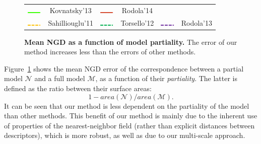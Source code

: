 \begin{figure}[h!]
\begin{tabular}{|cccccc|}
	\includegraphics[width=0.7cm]{figures/greenline.png} & \small{Kovnatsky'13\cite{kovnatsky2013coupled}} &
	\includegraphics[width=0.7cm]{figures/Dark_red_line.png} & \small{Rodola'14\cite{Rodola:2014:DNS:2679600.2679987}} \\
	\includegraphics[width=0.7cm]{figures/dashed_mustard.png} & \small{Sahilliouglu'11\cite{sahillioglu2011coarse}} &
	\includegraphics[width=0.7cm]{figures/dashed_green.png} & \small{Torsello'12\cite{Torsello:2012:GAD:2354409.2354702}} &
	\includegraphics[width=0.7cm]{figures/dashedpurple.png} & \small{Rodola'13\cite{rodola2013elastic}}\\
	\hline
\end{tabular}
\caption{{\textbf{Mean NGD as a function of model partiality.}}
	The error of our method increases less than the errors of other methods. 
}
\label{fig:Shrec16Part}

\end{figure}
Figure~\ref{fig:Shrec16Part} shows the mean NGD error of the correspondence between a partial model $\mathcal{N}$ and a full model $\mathcal{M}$, as a function of their {\em partiality}.
The latter is defined as the ratio between their surface areas: $$1-area(\mathcal{N})/area(\mathcal{M}).$$
It can be seen that our method is less dependent on the partiality of the model than other methods.
This benefit of our method is mainly due to the inherent use of properties of the nearest-neighbor field (rather than explicit distances between descriptors), which is more robust, as well as due to our multi-scale approach.

